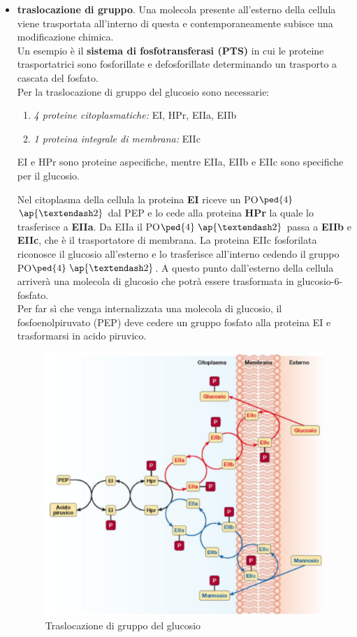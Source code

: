 \documentclass[11pt]{book}
\begin{document}
\begin{itemize}
\item \textbf{traslocazione di gruppo}. Una molecola presente all'esterno della cellula viene trasportata all’interno di questa e contemporaneamente subisce una modificazione chimica.\\
Un esempio è il \textbf{sistema di fosfotransferasi (PTS)} in cui le proteine trasportatrici sono fosforillate e defosforillate determinando un trasporto a cascata del fosfato.\\
Per la traslocazione di gruppo del glucosio sono necessarie:

\begin{enumerate}
\item \emph{4 proteine citoplasmatiche:} EI, HPr, EIIa, EIIb
\item \emph{1 proteina integrale di membrana:} EIIc
\end{enumerate}

EI e HPr sono proteine aspecifiche, mentre EIIa, EIIb e EIIc sono specifiche per il glucosio.

Nel citoplasma della cellula la proteina \textbf{EI} riceve un PO$\ped{4}$$\ap{–2}$ dal PEP e lo cede alla proteina \textbf{HPr} la quale lo trasferisce a \textbf{EIIa}. Da EIIa il PO$\ped{4}$$\ap{–2}$ passa a \textbf{EIIb} e \textbf{EIIc}, che è il trasportatore di membrana. La proteina EIIc fosforilata riconosce il glucosio all’esterno e lo trasferisce all’interno cedendo il gruppo PO$\ped{4}$$\ap{–2}$. A questo punto dall'esterno della cellula arriverà una molecola di glucosio che potrà essere trasformata in glucosio-6-fosfato.\\
Per far sì che venga internalizzata una molecola di glucosio, il fosfoenolpiruvato (PEP)  deve cedere un gruppo fosfato alla proteina EI e trasformarsi in acido piruvico.

\clearpage
\begin{figure}[htp]
\centering
\includegraphics[scale=0.4]{img/Traslocazione di gruppo.png}
\caption{Traslocazione di gruppo del glucosio}
\label{}
\end{figure}


\end{itemize}
\end{document}
